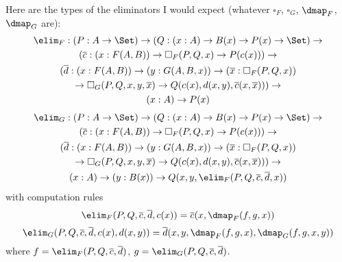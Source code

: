 \documentclass{article}
\begin{document}
Here are the types of the eliminators I would expect (whatever
$\square_F$, $\square_G$, $\dmap_F$, $\dmap_G$ are):
\begin{multline*}
\elim_F :  (P : A \to \Set) \to (Q : (x : A) \to B(x) \to P(x) \to \Set) \to \\
 (\overline{c} : (x : F(A, B)) \to \square_F(P, Q, x) \to P(c(x))) \to \\
 (\overline{d} : (x : F(A, B)) \to (y : G(A, B, x)) \to (\overline{x} : \square_F(P, Q, x)) \\ \to \square_G(P, Q, x, y, \overline{x}) \to Q(c(x), d(x, y), \overline{c}(x, \overline{x}))) \to \\
 (x : A) \to P(x)
\end{multline*}
\begin{multline*}
\elim_G :  (P : A \to \Set) \to (Q : (x : A) \to B(x) \to P(x) \to \Set) \to \\
 (\overline{c} : (x : F(A, B)) \to \square_F(P, Q, x) \to P(c(x))) \to \\
 (\overline{d} : (x : F(A, B)) \to (y : G(A, B, x)) \to (\overline{x} : \square_F(P, Q, x)) \\ \to \square_G(P, Q, x, y, \overline{x}) \to Q(c(x), d(x, y), \overline{c}(x, \overline{x}))) \to \\
 (x : A) \to (y : B(x)) \to Q(x, y, \elim_F(P, Q, \overline{c}, \overline{d}, x))
\end{multline*}
with computation rules
\[
\elim_F(P, Q, \overline{c}, \overline{d}, c(x)) = \overline{c}(x, \dmap_F(f, g, x))
\]
\[
\elim_G(P, Q, \overline{c}, \overline{d}, c(x), d(x, y)) = \overline{d}(x, y, \dmap_F(f, g, x), \dmap_G(f, g, x, y))
\]
where $f = \elim_F(P, Q, \overline{c}, \overline{d})$, $g = \elim_G(P, Q, \overline{c}, \overline{d})$.
\end{document}
